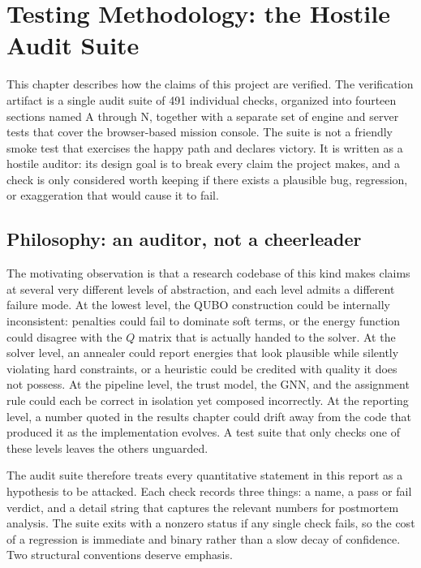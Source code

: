 \section{Testing Methodology: the Hostile Audit Suite}
\label{sec:testing}

This chapter describes how the claims of this project are verified. The
verification artifact is a single audit suite of 491 individual checks,
organized into fourteen sections named A through N, together with a separate
set of engine and server tests that cover the browser-based mission console.
The suite is not a friendly smoke test that exercises the happy path and
declares victory. It is written as a hostile auditor: its design goal is to
break every claim the project makes, and a check is only considered worth
keeping if there exists a plausible bug, regression, or exaggeration that
would cause it to fail.

\subsection{Philosophy: an auditor, not a cheerleader}

The motivating observation is that a research codebase of this kind makes
claims at several very different levels of abstraction, and each level
admits a different failure mode. At the lowest level, the QUBO construction
could be internally inconsistent: penalties could fail to dominate soft
terms, or the energy function could disagree with the $Q$ matrix that is
actually handed to the solver. At the solver level, an annealer could
report energies that look plausible while silently violating hard
constraints, or a heuristic could be credited with quality it does not
possess. At the pipeline level, the trust model, the GNN, and the
assignment rule could each be correct in isolation yet composed incorrectly.
At the reporting level, a number quoted in the results chapter could drift
away from the code that produced it as the implementation evolves. A test
suite that only checks one of these levels leaves the others unguarded.

The audit suite therefore treats every quantitative statement in this
report as a hypothesis to be attacked. Each check records three things: a
name, a pass or fail verdict, and a detail string that captures the
relevant numbers for postmortem analysis. The suite exits with a nonzero
status if any single check fails, so the cost of a regression is immediate
and binary rather than a slow decay of confidence. Two structural
conventions deserve emphasis.


